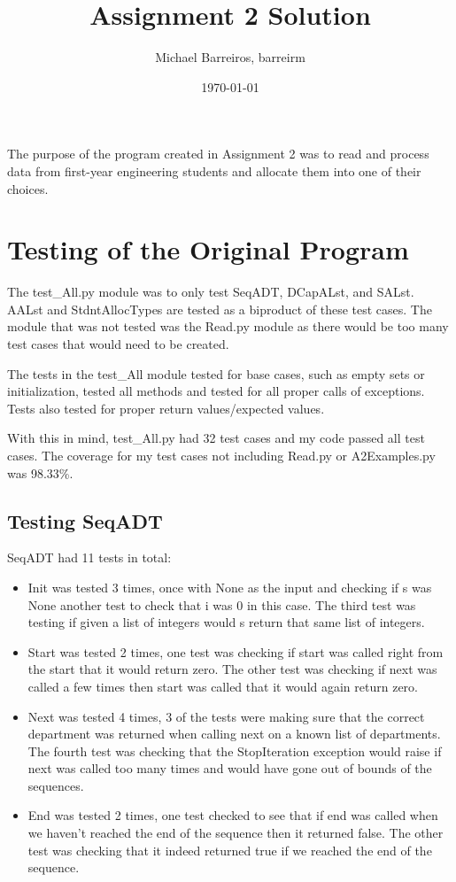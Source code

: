 \documentclass[12pt]{article}
\title{Assignment 2 Solution}
\author{Michael Barreiros, barreirm}
\date{\today}
\begin{document}
\maketitle

The purpose of the program created in Assignment 2 was to read and process data from first-year engineering students and allocate them
into one of their choices.

\section{Testing of the Original Program}

The test\_All.py module was to only test SeqADT, DCapALst, and SALst. AALst and StdntAllocTypes are tested as a biproduct of these test cases.
The module that was not tested was the Read.py module as there would be too many test cases that would need to be created.

The tests in the test\_All module tested for base cases, such as empty sets or initialization, tested all methods and tested for all 
proper calls of exceptions. Tests also tested for proper return values/expected values.

With this in mind, test\_All.py had 32 test cases and my code passed all test cases. The coverage for my test cases not including
Read.py or A2Examples.py was 98.33\%.

\subsection{Testing SeqADT}

SeqADT had 11 tests in total:
\begin{itemize}
	\item Init was tested 3 times, once with None as the input and checking if s was None another test to check that i was 0
	in this case. The third test was testing if given a list of integers would s return that same list of integers. 
	
	\item Start was tested 2 times, one test was checking if start was called right from the start that it would return zero. The other
	test was checking if next was called a few times then start was called that it would again return zero.
	
	\item Next was tested 4 times, 3 of the tests were making sure that the correct department was returned when calling next on a known
	list of departments. The fourth test was checking that the StopIteration exception would raise if next was called too many times and 
	would have gone out of bounds of the sequences.
	
	\item End was tested 2 times, one test checked to see that if end was called when we haven't reached the end of the sequence then it
	returned false. The other test was checking that it indeed returned true if we reached the end of the sequence.

\end{itemize}
	
\end{document}
